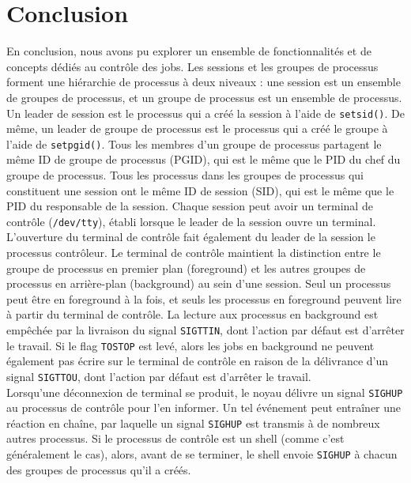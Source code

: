 \section{Conclusion}
En conclusion, nous avons pu explorer un ensemble de fonctionnalités et de concepts dédiés au contrôle des jobs.
\newline
Les sessions et les groupes de processus forment une hiérarchie de processus à deux niveaux : une session est un ensemble de groupes de processus, et un groupe de processus est un ensemble de processus.
\newline
Un leader de session est le processus qui a créé la session à l'aide de \texttt{setsid()}. De même, un leader de groupe de processus est le processus qui a créé le groupe à l'aide de \texttt{setpgid()}. Tous les membres d'un groupe de processus partagent le même ID de groupe de processus (PGID), qui est le même que le PID du chef du groupe de processus. Tous les processus dans les groupes de processus qui constituent une session ont le même ID de session (SID), qui est le même que le PID du responsable de la session.
\newline
Chaque session peut avoir un terminal de contrôle (\texttt{/dev/tty}), établi lorsque le leader de la session ouvre un terminal. L'ouverture du terminal de contrôle fait également du leader de la session le processus contrôleur.
\newline
Le terminal de contrôle maintient la distinction entre le groupe de processus en premier plan (foreground) et les autres groupes de processus en arrière-plan (background) au sein d'une session. Seul un processus peut être en foreground à la fois, et seuls les processus en foreground peuvent lire à partir du terminal de contrôle. La lecture aux processus en background est empêchée par la livraison du signal \texttt{SIGTTIN}, dont l'action par défaut est d'arrêter le travail. Si le flag \texttt{TOSTOP} est levé, alors les jobs en background ne peuvent également pas écrire sur le terminal de contrôle en raison de la délivrance d'un signal \texttt{SIGTTOU}, dont l'action par défaut est d'arrêter le travail.
\\
Lorsqu'une déconnexion de terminal se produit, le noyau délivre un signal \texttt{SIGHUP} au processus de contrôle pour l'en informer. Un tel événement peut entraîner une réaction en chaîne, par laquelle un signal \texttt{SIGHUP} est transmis à de nombreux autres processus. Si le processus de contrôle est un shell (comme c'est généralement le cas), alors, avant de se terminer, le shell envoie \texttt{SIGHUP} à chacun des groupes de processus qu'il a créés.
